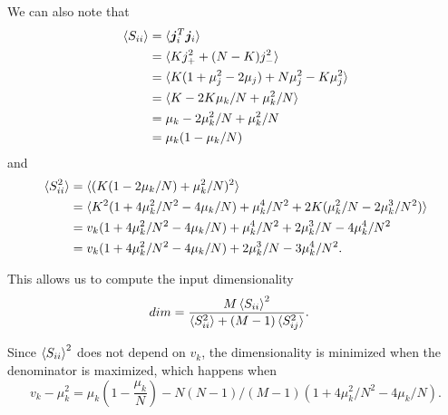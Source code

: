 \documentclass{article}
\renewcommand\b\bm
\begin{document}
We can also note that
\begin{align}
    \braket{S_{ii}} &= \braket{\b{j}_i^T \b{j}_i}\\
    &= \braket{K j_+^2 + (N-K) j_-^2}\\
    &= \braket{K (1 + \mu_j^2 - 2 \mu_j)  + N \mu_j^2 - K \mu_j^2}\\
    &= \braket{K - 2 K \mu_k/N + \mu_k^2/N}\\
    &= \mu_k - 2 \mu_k^2/N + \mu_k^2 / N\\
    &= \mu_k (1 - \mu_k / N)
\end{align}
and
\begin{align}
    \braket{S_{ii}^2} &= \braket{(K(1 - 2 \mu_k/N) + \mu_k^2/N)^2}\\
    &= \braket{K^2(1 + 4 \mu_k^2 / N^2 - 4 \mu_k/N) + \mu_k^4/N^2 + 2 K (\mu_k^2/N - 2 \mu_k^3/N^2)}\\
    &= v_k(1 + 4 \mu_k^2 / N^2 - 4 \mu_k/N) + \mu_k^4/N^2 + 2 \mu_k^3/N - 4 \mu_k^4/N^2\\
    &= v_k(1 + 4 \mu_k^2 / N^2 - 4 \mu_k/N) + 2 \mu_k^3/N - 3 \mu_k^4/N^2.
\end{align}

This allows us to compute the input dimensionality
\begin{align}
    dim &= \frac{M \braket{S_{ii}}^2}{\braket{S_{ii}^2} + (M-1) \braket{S_{ij}^2}}.
\end{align}

Since $\braket{S_{ii}}^2$ does not depend on $v_k$, the dimensionality is minimized when the denominator is maximized, which happens when
\begin{equation}
    v_k - \mu_k^2 = \mu_k ( 1 - \frac{\mu_k}{N}) - N(N-1)/(M-1) (1 + 4 \mu_k^2 / N^2 - 4 \mu_k/N).
\end{equation}
\end{document}
